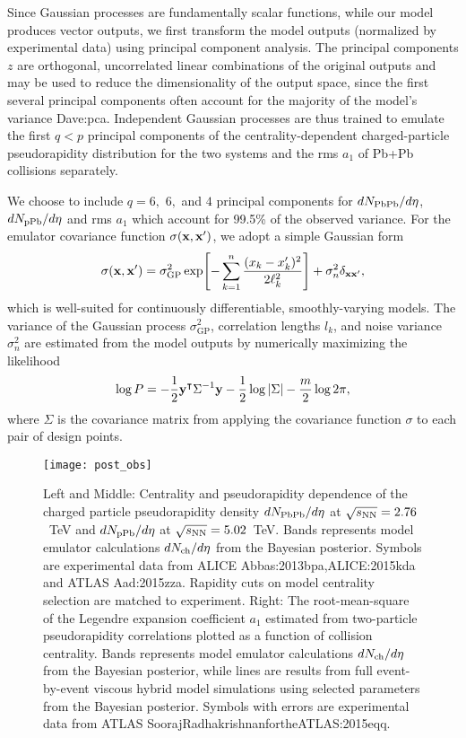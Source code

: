 Since Gaussian processes are fundamentally scalar functions, while our model produces vector outputs, we first transform the model outputs (normalized by experimental data) using principal component analysis.
The principal components $z$ are orthogonal, uncorrelated linear combinations of the original outputs and may be used to reduce the dimensionality of the output space, since the first several principal components often account for the majority of the model's variance {Dave:pca}.
Independent Gaussian processes are thus trained to emulate the first $q < p$ principal components of the centrality-dependent charged-particle pseudorapidity distribution for the two systems and the rms $a_1$ of Pb+Pb collisions separately.

We choose to include $q=6,$ $6,$ and $4$ principal components for $dN_\text{PbPb}/d\eta$,\, $dN_\text{pPb}/d\eta$ and rms $a_1$ which account for 99.5\% of the observed variance.
For the emulator covariance function $\sigma(\mathbf x, \mathbf x')$, we adopt a simple Gaussian form
\begin{equation}
  \sigma(\mathbf x, \mathbf x') = \sigma_\text{GP}^2 \exp\Biggl[ -\sum_{k=1}^n \frac{(x_k - x'_k)^2}{2\ell_k^2} \Biggr] + \sigma_n^2\delta_{\mathbf x\mathbf x'},
\end{equation}
which is well-suited for continuously differentiable, smoothly-varying models.
The variance of the Gaussian process $\sigma^2_\text{GP}$, correlation lengths $l_k$, and noise variance $\sigma_n^2$ are estimated from the model outputs by numerically maximizing the likelihood
\begin{equation}
  \log P = -\frac{1}{2}\mathbf y^\intercal \Sigma^{-1} \mathbf y - \frac{1}{2} \log | \Sigma | - \frac{m}{2} \log 2 \pi,
\end{equation}
where $\Sigma$ is the covariance matrix from applying the covariance function $\sigma$ to each pair of design points.

\begin{figure*}
  \texttt{[image: post\_obs]}
  \caption{
  Left and Middle: Centrality and pseudorapidity dependence of the charged particle pseudorapidity density $dN_\text{PbPb}/d\eta$ at $\sqrt{s_\mathrm{NN}}=2.76$~TeV and $dN_\text{pPb}/d\eta$ at $\sqrt{s_\mathrm{NN}}=5.02$~TeV.
  Bands represents model emulator calculations $dN_\text{ch}/d\eta$ from the Bayesian posterior.
  Symbols are experimental data from ALICE {Abbas:2013bpa,ALICE:2015kda} and ATLAS {Aad:2015zza}.
  Rapidity cuts on model centrality selection are matched to experiment.
  Right: 
  The root-mean-square of the Legendre expansion coefficient $a_1$ estimated from two-particle pseudorapidity correlations plotted as a function of collision centrality.
 Bands represents model emulator calculations $dN_\text{ch}/d\eta$ from the Bayesian posterior, while lines are results from full event-by-event viscous hybrid model simulations using selected parameters from the Bayesian posterior.
  Symbols with errors are experimental data from ATLAS {SoorajRadhakrishnanfortheATLAS:2015eqq}.  
  }
  \label{fig:post_obs}
\end{figure*}
